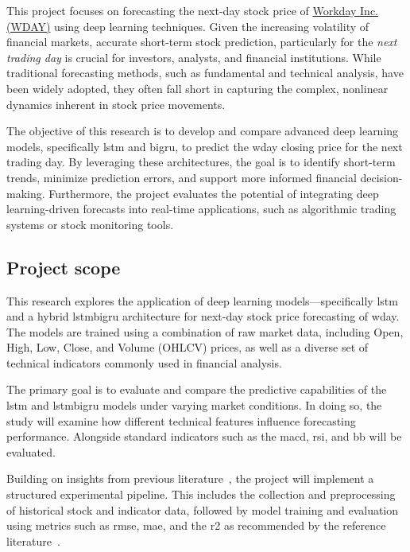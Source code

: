 This project focuses on forecasting the next-day stock price of 
\href{https://www.nasdaq.com/market-activity/stocks/wday}{Workday Inc. (WDAY)} using deep learning techniques. 
Given the increasing volatility of financial markets, accurate short-term stock prediction, particularly 
for the \emph{next trading day} is crucial for investors, analysts, and financial institutions. While traditional 
forecasting methods, such as fundamental and technical analysis, have been widely adopted, they often fall short in 
capturing the complex, nonlinear dynamics inherent in stock price movements.

The objective of this research is to develop and compare advanced deep learning models, specifically \acrfull{lstm} and 
\acrfull{bigru}, to predict the \acrfull{wday} closing price for the next trading day. By leveraging these architectures, the
goal is to identify short-term trends, minimize prediction errors, and support more informed financial 
decision-making. Furthermore, the project evaluates the potential of integrating deep learning-driven forecasts into
real-time applications, such as algorithmic trading systems or stock monitoring tools.

\subsection{Project scope}

This research explores the application of deep learning models—specifically 
\acrfull{lstm} and a hybrid \acrfull{lstmbigru} architecture for next-day stock price forecasting
of \acrfull{wday}. The models are trained using a combination of raw market data, 
including Open, High, Low, Close, and Volume (OHLCV) prices, as well as a diverse set of technical 
indicators commonly used in financial analysis.

The primary goal is to evaluate and compare the predictive capabilities of the 
\acrshort{lstm} and \acrshort{lstmbigru} models under varying market conditions. In doing so, the 
study will examine how different technical features influence forecasting performance. Alongside 
standard indicators such as the \acrfull{macd}, \acrfull{rsi}, and \acrfull{bb} will be evaluated.

Building on insights from previous literature~\parencite{parmar2018stock, nabipour2020DeepLearning}, 
the project will implement a structured experimental pipeline. This includes the collection and 
preprocessing of historical stock and indicator data, followed by model training and evaluation using
metrics such as \acrfull{rmse}, \acrfull{mae}, and the \acrfull{r2} as recommended by the reference 
literature~\parencite{chang2024StockPrediction, phuoc2024StockPrediction}.

